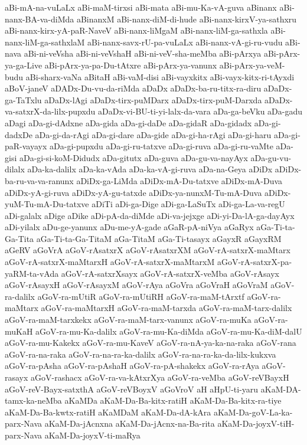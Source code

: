 {aBi-mA-na-vuLaLx
aBi-maM-tirxsi
aBi-mata
aBi-mu-Ka-vA-guva
aBinanx
aBi-nanx-BA-va-diMda
aBinanxM
aBi-nanx-diM-di-hude
aBi-nanx-kirxV-ya-sathxru
aBi-nanx-kirx-yA-paR-NaveV
aBi-nanx-liMgaM
aBi-nanx-liM-ga-sathxla
aBi-nanx-liM-ga-sathxlaM
aBi-nanx-savx-rU-pa-vuLaLx
aBi-nanx-vA-gi-ru-vudu
aBi-nava
aBi-ni-veVsha
aBi-ni-veVshaH
aBi-ni-veV-sha-meMba
aBi-pArxya
aBi-pArx-ya-ga-Live
aBi-pArx-ya-pa-Du-tAtxre
aBi-pArx-ya-vanunx
aBi-pArx-ya-veM-budu
aBi-sharx-vaNa
aBitaH
aBi-vaM-disi
aBi-vayxkitx
aBi-vayx-kitx-ri-tAyxdi
aBoV-janeV
aDADx-Du-vu-da-riMda
aDaDx
aDaDx-ba-ru-titx-ra-diru
aDaDx-ga-TaTxlu
aDaDx-lAgi
aDaDx-tirx-puMDarx
aDaDx-tirx-puM-Darxda
aDaDx-va-satxrX-da-lilx-pupxdu
aDaDx-vi-BU-ti-yi-lalx-da-vara
aDa-ga-beVku
aDa-gadu
aDagi
aDa-gi-dAdxne
aDa-gida
aDa-gi-daDe
aDa-gidaR
aDa-gidadx
aDa-gi-dadxDe
aDa-gi-da-rAgi
aDa-gi-dare
aDa-gide
aDa-gi-ha-rAgi
aDa-gi-haru
aDa-gi-paR-vayayx
aDa-gi-pupxdu
aDa-gi-ru-tatxve
aDa-gi-ruva
aDa-gi-ru-vaMte
aDa-gisi
aDa-gi-si-koM-Didudx
aDa-gitutx
aDa-guva
aDa-gu-va-nayAyx
aDa-gu-vu-dilalx
aDa-ka-dalilx
aDa-ka-vAda
aDa-ka-vA-gi-ruva
aDa-na-Geya
aDiDx
aDiDx-ba-ru-va-va-ranunx
aDiDx-ga-LiMda
aDiDx-mA-Du-tatxve
aDiDx-mA-Duva
aDiDx-yA-gi-ruva
aDiDx-yA-gu-tatxde
aDiDx-ya-nunxM-Tu-mA-Duva
aDiDx-yuM-Tu-mA-Du-tatxve
aDiTi
aDi-ga-Dige
aDi-ga-LaSuTx
aDi-ga-La-va-regU
aDi-galalx
aDige
aDike
aDi-pA-da-diMde
aDi-va-jejxge
aDi-yi-Da-lA-ga-dayAyx
aDi-yilalx
aDu-ge-yanunx
aDu-me-yA-gade
aGaR-pA-niVya
aGaRyx
aGa-Ti-ta-Ga-Tita
aGa-Ti-ta-Ga-TitaM
aGa-TitaM
aGa-Ti-tasayx
aGayxR
aGayxRM
aGeRV
aGoVrA
aGoV-rAsatxrX
aGoV-rAsatxrXM
aGoV-rA-satxrX-maMtarx
aGoV-rA-satxrX-maMtarxH
aGoV-rA-satxrX-maMtarxM
aGoV-rA-satxrX-pa-yaRM-ta-vAda
aGoV-rA-satxrXsayx
aGoV-rA-satxrX-veMba
aGoV-rAsayx
aGoV-rAsayxH
aGoV-rAsayxM
aGoV-rAya
aGoVra
aGoVraH
aGoVraM
aGoV-ra-dalilx
aGoV-ra-mUtiR
aGoV-ra-mUtiRH
aGoV-ra-maM-tArxtf
aGoV-ra-maMtarx
aGoV-ra-maMtarxH
aGoV-ra-maM-tarxda
aGoV-ra-maM-tarx-dalilx
aGoV-ra-maM-tarxkekx
aGoV-ra-maM-tarx-vanunx
aGoV-ra-muKa
aGoV-ra-muKaH
aGoV-ra-mu-Ka-dalilx
aGoV-ra-mu-Ka-diMda
aGoV-ra-mu-Ka-diM-dalU
aGoV-ra-mu-Kakekx
aGoV-ra-mu-KaveV
aGoV-ra-nA-ya-ka-na-raka
aGoV-rana
aGoV-ra-na-raka
aGoV-ra-na-ra-ka-dalilx
aGoV-ra-na-ra-ka-da-lilx-kukxva
aGoV-ra-pAsha
aGoV-ra-pAshaH
aGoV-ra-pA-shakekx
aGoV-ra-rAya
aGoV-rasayx
aGoV-rashacx
aGoV-ra-va-kAtxrXya
aGoV-ra-veMba
aGoV-reVBayxH
aGoV-reV-Bayx-satxthA
aGoV-reVBoyxV
aGoVroV
aH
aHpU-ti-yaru
aKaM-DA-tamx-ka-neMba
aKaMDa
aKaM-Da-Ba-kitx-ratiH
aKaM-Da-Ba-kitx-ra-tiye
aKaM-Da-Ba-kwtx-ratiH
aKaMDaM
aKaM-Da-dA-kAra
aKaM-Da-goV-La-ka-parx-Nava
aKaM-Da-jAcnxna
aKaM-Da-jAcnx-na-Ba-rita
aKaM-Da-joyxV-tiH-parx-Nava
aKaM-Da-joyxV-ti-maRya
}
